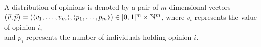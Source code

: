\documentclass[preview]{standalone}
\begin{document}
\begin{center}
A distribution of opinions is denoted by a pair of $m$-dimensional vectors\\ 
                   $(\vec{v},\vec{p}) = (\langle v_1,\ldots,v_m \rangle,\langle p_1,\ldots,p_m \rangle)\\ 
                   \in [0,1]^m \times \mathbb{N}^m$, where $v_i$ represents the value of opinion $i$,\\
                   and $p_i$ represents the number of individuals holding opinion $i$.
\end{center}
\end{document}
